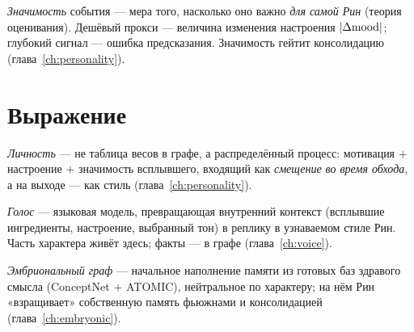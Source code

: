 \begin{definition}
\emph{Значимость} события — мера того, насколько оно важно \emph{для самой Рин}
(теория оценивания). Дешёвый прокси — величина изменения настроения $|\Delta\mathrm{mood}|$;
глубокий сигнал — ошибка предсказания. Значимость гейтит консолидацию
(глава~\ref{ch:personality}).
\end{definition}

\section{Выражение}

\begin{definition}[Личность]
\emph{Личность} — не таблица весов в графе, а распределённый процесс: мотивация
$+$ настроение $+$ значимость всплывшего, входящий как \emph{смещение во время
обхода}, а на выходе — как стиль (глава~\ref{ch:personality}).
\end{definition}

\begin{definition}
\emph{Голос} — языковая модель, превращающая внутренний контекст (всплывшие
ингредиенты, настроение, выбранный тон) в реплику в узнаваемом стиле Рин. Часть
характера живёт здесь; факты — в графе (глава~\ref{ch:voice}).
\end{definition}

\begin{definition}
\emph{Эмбриональный граф} — начальное наполнение памяти из готовых баз здравого
смысла (ConceptNet $+$ ATOMIC), нейтральное по характеру; на нём Рин «взращивает»
собственную память фьюжнами и консолидацией (глава~\ref{ch:embryonic}).
\end{definition}

